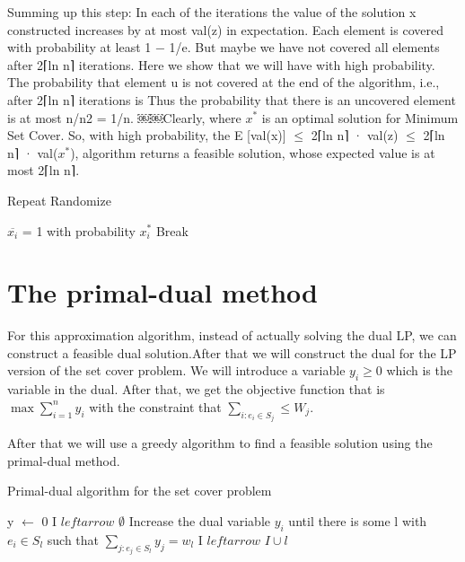 \documentclass[usletter]{article}
\begin{document}
Summing up this step: In each of the iterations the value of the solution x constructed increases by at most val(z) in expectation. Each element is covered with probability at least 1 − 1/e. But maybe we have not covered all elements after 2⌈ln n⌉ iterations. Here we show that we will have with high probability.
The probability that element u is not covered at the end of the algorithm, i.e., after
2⌈ln n⌉ iterations is
Thus the probability that there is an uncovered element is at most n/n2 = 1/n.
￼￼Clearly, where $x^*$ is an optimal solution for Minimum Set Cover. So, with high probability, the
E [val(x)] $\le$ 2⌈ln n⌉ · val(z) $\le$ 2⌈ln n⌉ · val($x^*$),
algorithm returns a feasible solution, whose expected value is at most 2⌈ln n⌉.

\begin{algorithm}
\caption{Repeat Randomize}
\begin{algorithmic}[1]
	\State $\overline{x_i}$ = 1 with probability $x_i^*$
		\State Break
	\EndIf
\EndFor
\EndProcedure
\end{algorithmic}
\end{algorithm}

\section{The primal-dual method}
For this approximation algorithm, instead of actually solving the dual LP, we can construct a feasible dual solution.After that we will construct the dual for the LP version of the set cover problem. We will introduce a variable $y_{i} \ge 0$ which is the variable in the dual. After that, we get the objective function that is  $\max{\sum_{i=1}^{n}{y_i}}$ with the constraint that $\sum_{i: e_i \in S_j} \le W_j$.

After that we will use a greedy algorithm to find  a feasible solution using the primal-dual method.

\begin{algorithm}
\caption{Primal-dual algorithm for the set cover problem}
\begin{algorithmic}[2]
\State y $\leftarrow$ 0
\State I $leftarrow$ $\emptyset$
	\State Increase the dual variable $y_i$ until there is some l with $e_i \in S_l$ such that
		$\sum_{j: e_j \in S_l}{y_j} = w_l$
	\State I $leftarrow$ $I \cup {l}$
\EndWhile
\end{algorithmic}
\end{algorithm}
\end{document}
